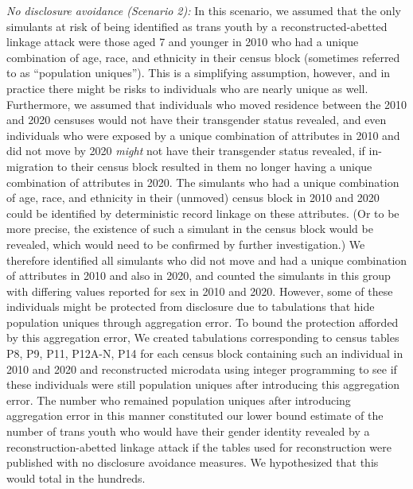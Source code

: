 \documentclass{jpc} %
\theoremstyle{plain}\newtheorem{satz}[thm]{Satz} %
\begin{document}
\emph{No disclosure avoidance (Scenario 2):} In this scenario, we assumed that the only simulants at risk of being identified as trans youth by a reconstructed-abetted linkage attack were those aged 7 and younger in 2010 who had a unique combination of age, race, and ethnicity in their census block (sometimes referred to as ``population uniques'').  This is a simplifying assumption, however, and in practice there might be risks to individuals who are nearly unique as well.  Furthermore, we assumed that individuals who moved residence between the 2010 and 2020 censuses would not have their transgender status revealed, and even individuals who were exposed by a unique combination of attributes in 2010 and did not move by 2020 \emph{might} not have their transgender status revealed, if in-migration to their census block resulted in them no longer having a unique combination of attributes in 2020.  The simulants who had a unique combination of age, race, and ethnicity in their (unmoved) census block in 2010 and 2020 could be identified by deterministic record linkage on these attributes. (Or to be more precise, the existence of such a simulant in the census block would be revealed, which would need to be confirmed by further investigation.)  We therefore identified all simulants who did not move and had a unique combination of attributes in 2010 and also in 2020, and counted the simulants in this group with differing values reported for sex in 2010 and 2020.  However, some of these individuals might be protected from disclosure due to tabulations that hide population uniques through aggregation error. To bound the protection afforded by this aggregation error, We created tabulations corresponding to census tables P8, P9, P11, P12A-N, P14 for each census block containing such an individual in 2010 and 2020 and reconstructed microdata using integer programming to see if these individuals were still population uniques after introducing this aggregation error. The number who remained population uniques after introducing aggregation error in this manner constituted our lower bound estimate of the number of trans youth who would have their gender identity revealed by a reconstruction-abetted linkage attack if the tables used for reconstruction were published with no disclosure avoidance measures.
We hypothesized that this would total in the hundreds.
\end{document}
